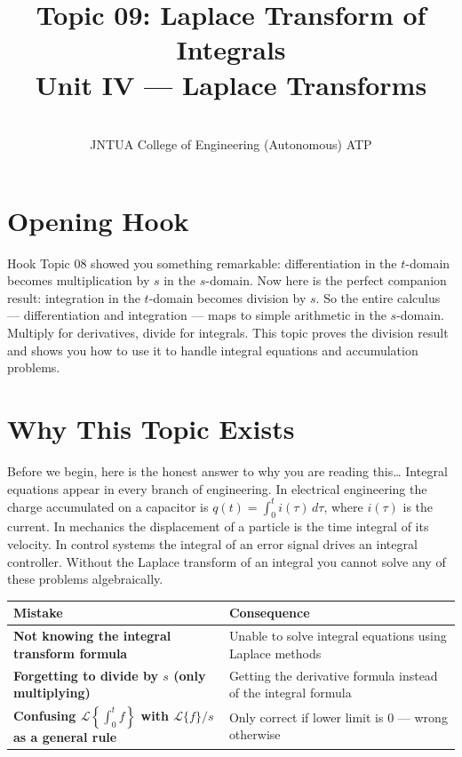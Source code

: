 \documentclass[12pt,a4paper]{article}
\title{Topic 09: Laplace Transform of Integrals \\
       \large Unit IV --- Laplace Transforms}
\author{ \\
        JNTUA College of Engineering (Autonomous) ATP}
\date{}
\begin{document}
\maketitle
\tableofcontents
\newpage

\section{Opening Hook}

\begin{curiositybox}{Hook}
Topic 08 showed you something remarkable: differentiation in the $t$-domain becomes
multiplication by $s$ in the $s$-domain. Now here is the perfect companion result:
integration in the $t$-domain becomes division by $s$. So the entire calculus ---
differentiation and integration --- maps to simple arithmetic in the $s$-domain.
Multiply for derivatives, divide for integrals. This topic proves the division result and
shows you how to use it to handle integral equations and accumulation problems.
\end{curiositybox}

\section{Why This Topic Exists}

Before we begin, here is the honest answer to why you are reading this\ldots{}
Integral equations appear in every branch of engineering. In electrical engineering the
charge accumulated on a capacitor is $q(t) = \int_0^t i(\tau)\,d\tau$, where $i(\tau)$
is the current. In mechanics the displacement of a particle is the time integral of its
velocity. In control systems the integral of an error signal drives an integral
controller. Without the Laplace transform of an integral you cannot solve any of these
problems algebraically.

\begin{center}
\begin{tabular}{>{\bfseries}p{6.5cm} p{7.5cm}}
\toprule
Mistake & Consequence \\
\midrule
Not knowing the integral transform formula &
  Unable to solve integral equations using Laplace methods \\
\addlinespace
Forgetting to divide by $s$ (only multiplying) &
  Getting the derivative formula instead of the integral formula \\
\addlinespace
Confusing $\mathcal{L}\!\left\{\int_0^t f\right\}$ with $\mathcal{L}\{f\}/s$ as a
  general rule &
  Only correct if lower limit is $0$ --- wrong otherwise \\
\bottomrule
\end{tabular}
\end{center}
\end{document}
